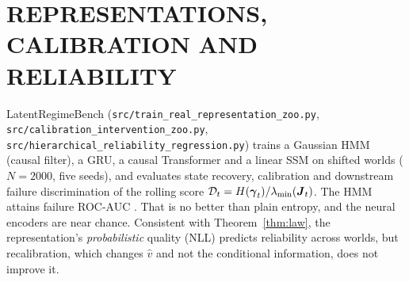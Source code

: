 \section{REPRESENTATIONS, CALIBRATION AND RELIABILITY}
\label{app:zoo}
LatentRegimeBench (\texttt{src/train\_real\_representation\_zoo.py}, \texttt{src/calibration\_intervention\_zoo.py}, \texttt{src/hierarchical\_reliability\_regression.py}) trains a Gaussian HMM (causal filter), a GRU, a causal Transformer and a linear SSM on shifted worlds ($N=2000$, five seeds), and evaluates state recovery, calibration and downstream failure discrimination of the rolling score $\mathcal D_t=H(\boldsymbol{\gamma}_t)/\lambda_{\min}(\boldsymbol{J}_t)$. The HMM attains failure ROC-AUC \ZooAucHMM. That is no better than plain entropy, and the neural encoders are near chance. Consistent with Theorem~\ref{thm:law}, the representation's \emph{probabilistic} quality (NLL) predicts reliability across worlds, but recalibration, which changes $\hat v$ and not the conditional information, does not improve it.
\begin{table}[h]\centering\footnotesize
\caption{Temperature scaling (\texttt{reports/representation\_zoo\_calibration\_intervention.csv}).}\label{tab:zoocal}

\end{table}
\begin{table}[h]\centering\footnotesize
\caption{Leave-one-world-out prediction of downstream reliability (15 worlds, \texttt{reports/representation\_zoo\_lowo\_evaluation.csv}). With 15 worlds the effective sample is small; we report the comparison, not a significance claim.}\label{tab:lowo}

\end{table}

